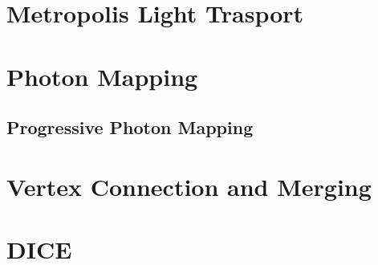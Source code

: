\section{Metropolis Light Trasport}





\section{Photon Mapping}
\subsection{Progressive Photon Mapping}




\section{Vertex Connection and Merging}




\section{DICE}